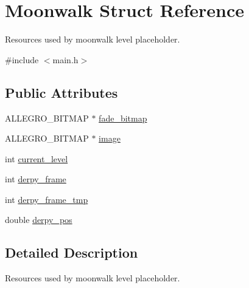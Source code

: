 \hypertarget{structMoonwalk}{\section{\-Moonwalk \-Struct \-Reference}
\label{structMoonwalk}
}


\-Resources used by moonwalk level placeholder.  




{\ttfamily \#include $<$main.\-h$>$}

\subsection*{\-Public \-Attributes}
\begin{DoxyCompactItemize}
\item 
\-A\-L\-L\-E\-G\-R\-O\-\_\-\-B\-I\-T\-M\-A\-P $\ast$ \hyperlink{structMoonwalk_adfea9d8976238abf5d94a797df7ee929}{fade\-\_\-bitmap}
\item 
\-A\-L\-L\-E\-G\-R\-O\-\_\-\-B\-I\-T\-M\-A\-P $\ast$ \hyperlink{structMoonwalk_a99f8ce8d3a4a8c3faca18b7c36eccdca}{image}
\item 
int \hyperlink{structMoonwalk_a841870902dfd149bb19576a64e0ae8bf}{current\-\_\-level}
\item 
int \hyperlink{structMoonwalk_a4a3874c58e11745d4896b004861e1555}{derpy\-\_\-frame}
\item 
int \hyperlink{structMoonwalk_ab087ba01cd2a107286ec8f75f58c676c}{derpy\-\_\-frame\-\_\-tmp}
\item 
double \hyperlink{structMoonwalk_a69689c77a64928bfb52c1dc1e1f7b33f}{derpy\-\_\-pos}
\end{DoxyCompactItemize}


\subsection{\-Detailed \-Description}
\-Resources used by moonwalk level placeholder. 

